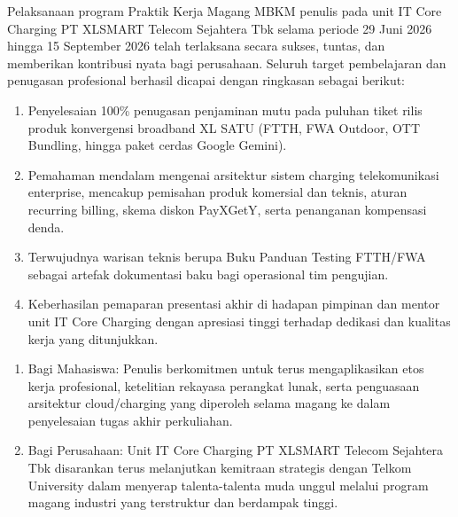 \documentclass[12pt,a4paper]{article}
\begin{document}
\vspace{0.2cm}
Pelaksanaan program Praktik Kerja Magang MBKM penulis pada unit IT Core Charging PT XLSMART Telecom Sejahtera Tbk selama periode 29 Juni 2026 hingga 15 September 2026 telah terlaksana secara sukses, tuntas, dan memberikan kontribusi nyata bagi perusahaan. Seluruh target pembelajaran dan penugasan profesional berhasil dicapai dengan ringkasan sebagai berikut:
\begin{enumerate}[label=\arabic*.,leftmargin=1.5em,itemsep=2pt,topsep=2pt]
    \item Penyelesaian 100\% penugasan penjaminan mutu pada puluhan tiket rilis produk konvergensi broadband XL SATU (FTTH, FWA Outdoor, OTT Bundling, hingga paket cerdas Google Gemini).
    \item Pemahaman mendalam mengenai arsitektur sistem charging telekomunikasi enterprise, mencakup pemisahan produk komersial dan teknis, aturan recurring billing, skema diskon PayXGetY, serta penanganan kompensasi denda.
    \item Terwujudnya warisan teknis berupa Buku Panduan Testing FTTH/FWA sebagai artefak dokumentasi baku bagi operasional tim pengujian.
    \item Keberhasilan pemaparan presentasi akhir di hadapan pimpinan dan mentor unit IT Core Charging dengan apresiasi tinggi terhadap dedikasi dan kualitas kerja yang ditunjukkan.
\end{enumerate}

\vspace{0.4cm}
\vspace{0.2cm}
\begin{enumerate}[label=\arabic*.,leftmargin=1.5em,itemsep=2pt,topsep=2pt]
    \item Bagi Mahasiswa: Penulis berkomitmen untuk terus mengaplikasikan etos kerja profesional, ketelitian rekayasa perangkat lunak, serta penguasaan arsitektur cloud/charging yang diperoleh selama magang ke dalam penyelesaian tugas akhir perkuliahan.
    \item Bagi Perusahaan: Unit IT Core Charging PT XLSMART Telecom Sejahtera Tbk disarankan terus melanjutkan kemitraan strategis dengan Telkom University dalam menyerap talenta-talenta muda unggul melalui program magang industri yang terstruktur dan berdampak tinggi.
\end{enumerate}
\end{document}
